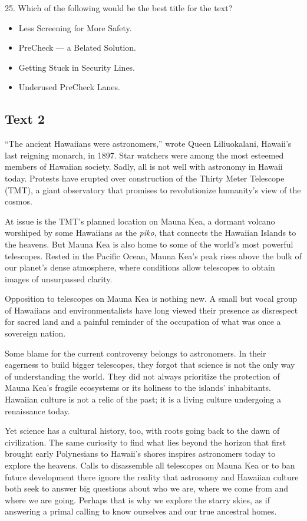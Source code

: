 \documentclass[UTF8,11pt]{ctexart}
\begin{document}
25. Which of the following would be the best title for the text?


\begin{itemize}[leftmargin=2em,itemsep=.2em,topsep=.4em]\item[A.] Less Screening for More Safety.
\item[B.] PreCheck — a Belated Solution.
\item[C.] Getting Stuck in Security Lines.
\item[D.] Underused PreCheck Lanes.
\end{itemize}

\subsection*{\textbf{Text 2}}


“The ancient Hawaiians were astronomers,” wrote Queen Liliuokalani, Hawaii’s last reigning monarch, in 1897. Star watchers were among the most esteemed members of Hawaiian society. Sadly, all is not well with astronomy in Hawaii today. Protests have erupted over construction of the Thirty Meter Telescope (TMT), a giant observatory that promises to revolutionize humanity’s view of the cosmos.


At issue is the TMT’s planned location on Mauna Kea, a dormant volcano worshiped by some Hawaiians as the \textit{piko}, that connects the Hawaiian Islands to the heavens. But Mauna Kea is also home to some of the world’s most powerful telescopes. Rested in the Pacific Ocean, Mauna Kea’s peak rises above the bulk of our planet’s dense atmosphere, where conditions allow telescopes to obtain images of unsurpassed clarity.


Opposition to telescopes on Mauna Kea is nothing new. A small but vocal group of Hawaiians and environmentalists have long viewed their presence as disrespect for sacred land and a painful reminder of the occupation of what was once a sovereign nation.


Some blame for the current controversy belongs to astronomers. In their eagerness to build bigger telescopes, they forgot that science is not the only way of understanding the world. They did not always prioritize the protection of Mauna Kea’s fragile ecosystems or its holiness to the islands’ inhabitants. Hawaiian culture is not a relic of the past; it is a living culture undergoing a renaissance today.


Yet science has a cultural history, too, with roots going back to the dawn of civilization. The same curiosity to find what lies beyond the horizon that first brought early Polynesians to Hawaii’s shores inspires astronomers today to explore the heavens. Calls to disassemble all telescopes on Mauna Kea or to ban future development there ignore the reality that astronomy and Hawaiian culture both seek to answer big questions about who we are, where we come from and where we are going. Perhaps that is why we explore the starry skies, as if answering a primal calling to know ourselves and our true ancestral homes.
\end{document}
